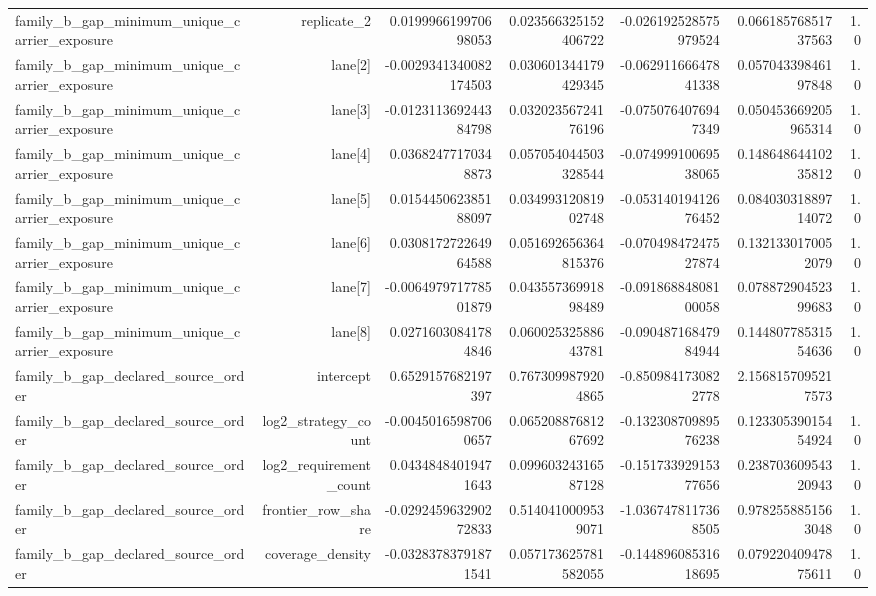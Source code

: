 {\begin{longtable}{lrrrrrr}
family\_b\_gap\_minimum\_unique\_carrier\_exposure & replicate\_2 & 0.019996619970698053 & 0.023566325152406722 & -0.026192528575979524 & 0.06618576851737563 & 1.0 \\
family\_b\_gap\_minimum\_unique\_carrier\_exposure & lane[2] & -0.0029341340082174503 & 0.030601344179429345 & -0.06291166647841338 & 0.05704339846197848 & 1.0 \\
family\_b\_gap\_minimum\_unique\_carrier\_exposure & lane[3] & -0.012311369244384798 & 0.03202356724176196 & -0.0750764076947349 & 0.050453669205965314 & 1.0 \\
family\_b\_gap\_minimum\_unique\_carrier\_exposure & lane[4] & 0.03682477170348873 & 0.057054044503328544 & -0.07499910069538065 & 0.14864864410235812 & 1.0 \\
family\_b\_gap\_minimum\_unique\_carrier\_exposure & lane[5] & 0.015445062385188097 & 0.03499312081902748 & -0.05314019412676452 & 0.08403031889714072 & 1.0 \\
family\_b\_gap\_minimum\_unique\_carrier\_exposure & lane[6] & 0.030817272264964588 & 0.051692656364815376 & -0.07049847247527874 & 0.1321330170052079 & 1.0 \\
family\_b\_gap\_minimum\_unique\_carrier\_exposure & lane[7] & -0.006497971778501879 & 0.04355736991898489 & -0.09186884808100058 & 0.07887290452399683 & 1.0 \\
family\_b\_gap\_minimum\_unique\_carrier\_exposure & lane[8] & 0.02716030841784846 & 0.06002532588643781 & -0.09048716847984944 & 0.14480778531554636 & 1.0 \\
family\_b\_gap\_declared\_source\_order & intercept & 0.6529157682197397 & 0.7673099879204865 & -0.8509841730822778 & 2.1568157095217573 &  \\
family\_b\_gap\_declared\_source\_order & log2\_strategy\_count & -0.00450165987060657 & 0.06520887681267692 & -0.13230870989576238 & 0.12330539015454924 & 1.0 \\
family\_b\_gap\_declared\_source\_order & log2\_requirement\_count & 0.04348484019471643 & 0.09960324316587128 & -0.15173392915377656 & 0.23870360954320943 & 1.0 \\
family\_b\_gap\_declared\_source\_order & frontier\_row\_share & -0.029245963290272833 & 0.5140410009539071 & -1.0367478117368505 & 0.9782558851563048 & 1.0 \\
family\_b\_gap\_declared\_source\_order & coverage\_density & -0.03283783791871541 & 0.057173625781582055 & -0.14489608531618695 & 0.07922040947875611 & 1.0 \\

\end{longtable}}
